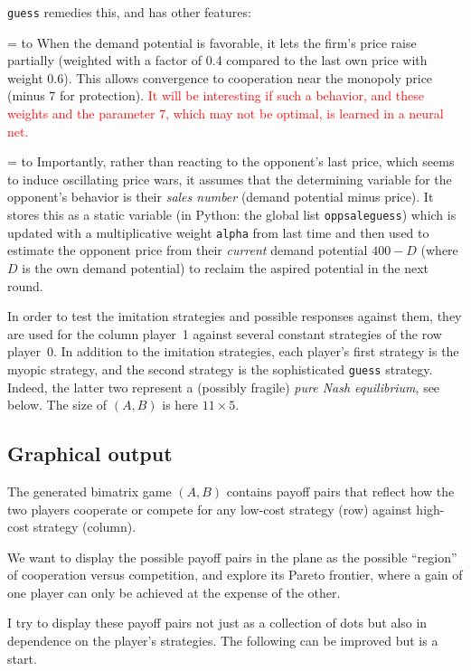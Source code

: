 \documentclass[a4paper,12pt]{article}  %
\def\R{\textcolor{red}}
\def\rmitem#1{\par\hangafter=1\hangindent=\einr
  \noindent\hbox to\einr{\ignorespaces#1\hfill}\ignorespaces}
\newcommand\bullitem{\rmitem{\raise.17ex\hbox{\kern7pt\scriptsize$\bullet$}}}
\theoremstyle{definition}
\begin{document}
{\tt guess} remedies this, and has other features:

\bullitem
When the demand potential is favorable, it lets the firm's
price raise partially (weighted with a factor of 0.4
compared to the last own price with weight 0.6).
This allows convergence to cooperation near the monopoly
price (minus 7 for protection).
\R{It will be interesting if such a behavior, and these
weights and the parameter 7, which may not be optimal, is
learned in a neural net.}

\bullitem
Importantly, rather than reacting to the opponent's last
price, which seems to induce oscillating price wars, it
assumes that the determining variable for the opponent's
behavior is their \textit{sales number} (demand potential
minus price). 
It stores this as a static variable
(in Python: the global list {\tt oppsaleguess}) which is
updated with a multiplicative weight {\tt alpha} from last
time and then used to estimate the opponent price from their
\textit{current} demand potential $400-D$ (where $D$ is the
own demand potential) to reclaim the aspired potential in
the next round.

In order to test the imitation strategies and possible
responses against them, they are used for the column
player~1 against several constant strategies of the row
player~0.
In addition to the imitation strategies, 
each player's first strategy is the myopic strategy, and the
second strategy is the sophisticated {\tt guess} strategy.
Indeed, the latter two represent a (possibly fragile)
\textit{pure Nash equilibrium}, see below.
The size of $(A,B)$ is here $11\times 5$.

\subsection{Graphical output}

The generated bimatrix game $(A,B)$ contains payoff pairs
that reflect how the two players cooperate or compete for
any low-cost strategy (row) against high-cost strategy
(column).

We want to display the possible payoff pairs in the plane as
the possible ``region'' of cooperation versus competition,
and explore its Pareto frontier, where a gain of one player
can only be achieved at the expense of the other.

I try to display these payoff pairs not just as a collection
of dots but also in dependence on the player's strategies.
The following can be improved but is a start.
\end{document}
